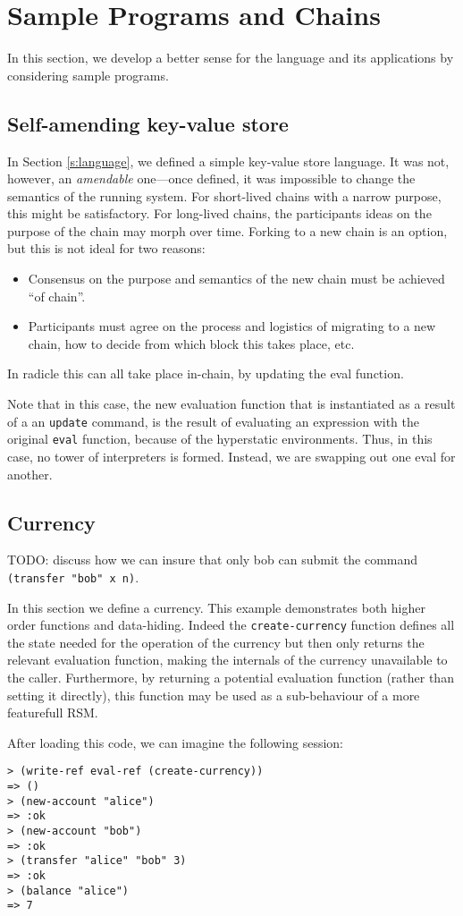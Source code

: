 \section{Sample Programs and Chains}
\label{s:examples}

In this section, we develop a better sense for the language and its
applications by considering sample programs.

\subsection{Self-amending key-value store}

In Section \ref{s:language}, we defined a simple key-value store language. It
was not, however, an \emph{amendable} one---once defined, it was impossible to
change the semantics of the running system. For short-lived chains with a narrow
purpose, this might be satisfactory. For long-lived chains, the participants
ideas on the purpose of the chain may morph over time. Forking to a new chain is
an option, but this is not ideal for two reasons:
\begin{itemize}
  \item Consensus on the purpose and semantics of the new chain must be achieved
    ``of chain''.
  \item Participants must agree on the process and logistics of migrating to a
    new chain, how to decide from which block this takes place, etc.
\end{itemize}
In radicle this can all take place in-chain, by updating the eval function.

Note that in this case, the new evaluation function that is instantiated as a
result of a an \texttt{update} command, is the result of evaluating an
expression with the original \texttt{eval} function, because of the hyperstatic
environments. Thus, in this case, no tower of interpreters is formed. Instead,
we are swapping out one eval for another.

\subsection{Currency}

TODO: discuss how we can insure that only bob can submit the command
\texttt{(transfer "bob" x n)}.

In this section we define a currency. This example demonstrates both higher
order functions and data-hiding. Indeed the \texttt{create-currency} function
defines all the state needed for the operation of the currency but then only
returns the relevant evaluation function, making the internals of the currency
unavailable to the caller. Furthermore, by returning a potential evaluation
function (rather than setting it directly), this function may be used as a
sub-behaviour of a more featurefull RSM.

After loading this code, we can imagine the following \rad{} session:
\bigskip
\begin{Verbatim}[fontsize=\small]
> (write-ref eval-ref (create-currency))
=> ()
> (new-account "alice")
=> :ok
> (new-account "bob")
=> :ok
> (transfer "alice" "bob" 3)
=> :ok
> (balance "alice")
=> 7
\end{Verbatim}

